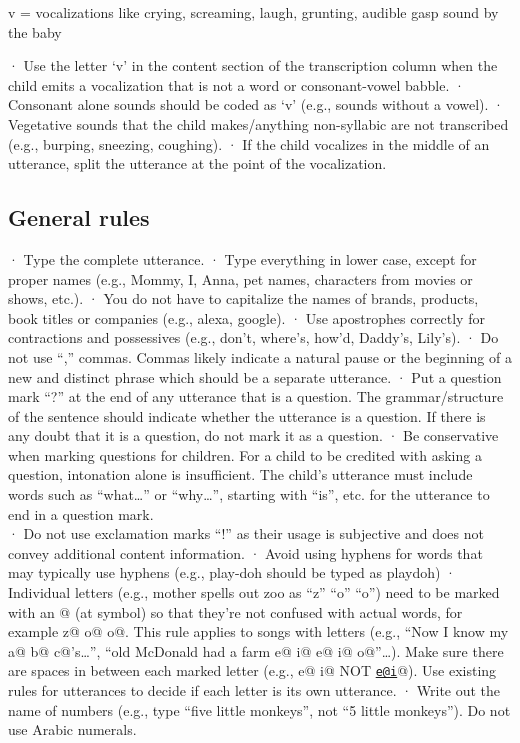 \documentclass[
]{book}
\begin{document}
v = vocalizations like crying, screaming, laugh, grunting, audible gasp sound by the baby

· Use the letter `v' in the content section of the transcription column when the child emits a vocalization that is not a word or consonant-vowel babble.
· Consonant alone sounds should be coded as `v' (e.g., sounds without a vowel).
· Vegetative sounds that the child makes/anything non-syllabic are not transcribed (e.g., burping, sneezing, coughing).
· If the child vocalizes in the middle of an utterance, split the utterance at the point of the vocalization.

\hypertarget{general-rules}{%
\subsection{General rules}\label{general-rules}}

· Type the complete utterance.
· Type everything in lower case, except for proper names (e.g., Mommy, I, Anna, pet names, characters from movies or shows, etc.).
· You do not have to capitalize the names of brands, products, book titles or companies (e.g., alexa, google).
· Use apostrophes correctly for contractions and possessives (e.g., don't, where's, how'd, Daddy's, Lily's).
· Do not use ``,'' commas. Commas likely indicate a natural pause or the beginning of a new and distinct phrase which should be a separate utterance.
· Put a question mark ``?'' at the end of any utterance that is a question. The grammar/structure of the sentence should indicate whether the utterance is a question. If there is any doubt that it is a question, do not mark it as a question.
· Be conservative when marking questions for children. For a child to be credited with asking a question, intonation alone is insufficient. The child's utterance must include words such as ``what\ldots{}'' or ``why\ldots{}'', starting with ``is'', etc. for the utterance to end in a question mark.\\
· Do not use exclamation marks ``!'' as their usage is subjective and does not convey additional content information.
· Avoid using hyphens for words that may typically use hyphens (e.g., play-doh should be typed as playdoh)
· Individual letters (e.g., mother spells out zoo as ``z'' ``o'' ``o'') need to be marked with an @ (at symbol) so that they're not confused with actual words, for example z@ o@ o@. This rule applies to songs with letters (e.g., ``Now I know my a@ b@ c@'s\ldots{}'', ``old McDonald had a farm e@ i@ e@ i@ o@''\ldots). Make sure there are spaces in between each marked letter (e.g., e@ i@ NOT \href{mailto:e@i}{\nolinkurl{e@i}}@). Use existing rules for utterances to decide if each letter is its own utterance.
· Write out the name of numbers (e.g., type ``five little monkeys'', not ``5 little monkeys''). Do not use Arabic numerals.
\end{document}
